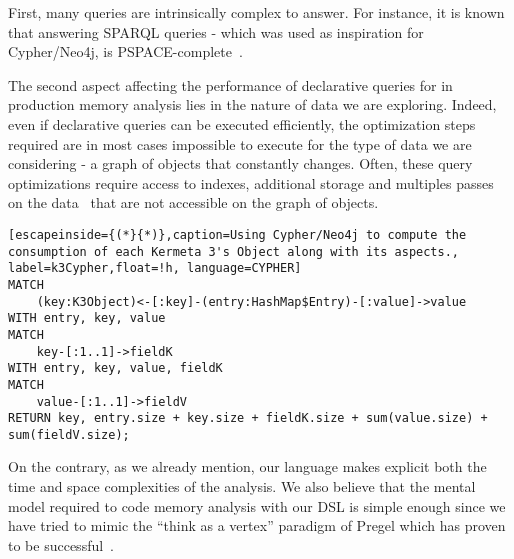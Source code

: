 First, many queries are intrinsically complex to answer.
For instance, it is known that answering SPARQL queries - which was used as inspiration for Cypher/Neo4j, is PSPACE-complete~\cite{Schmidt:2010:FSQ:1804669.1804675, Perez:2009:SCS:1567274.1567278}. 

The second aspect affecting the performance of declarative queries for in production memory analysis lies in the nature of data we are exploring. 
Indeed, even if declarative queries can be executed efficiently, the optimization steps required are in most cases impossible to execute for the type of data we are considering - a graph of objects that constantly changes.
Often, these query optimizations require access to indexes, additional storage and multiples passes on the data~\cite{Elhemali:2007:ESS:1247480.1247598, Dageville:2002:SMM:1287369.1287454} that are not accessible on the graph of objects.


\begin{lstlisting}[escapeinside={(*}{*)},caption=Using Cypher/Neo4j to compute the consumption of each Kermeta 3's Object along with its aspects., label=k3Cypher,float=!h, language=CYPHER]
MATCH 
	(key:K3Object)<-[:key]-(entry:HashMap$Entry)-[:value]->value
WITH entry, key, value
MATCH 
	key-[:1..1]->fieldK
WITH entry, key, value, fieldK
MATCH 
	value-[:1..1]->fieldV
RETURN key, entry.size + key.size + fieldK.size + sum(value.size) + sum(fieldV.size);
\end{lstlisting}

On the contrary, as we already mention, our language makes explicit both the time and space complexities of the analysis.
We also believe that the mental model required to code memory analysis with our DSL is simple enough since
we have tried to mimic the ``think as a vertex'' paradigm of Pregel which has proven to be successful~\cite{Malewicz:2010:PSL:1807167.1807184}.

